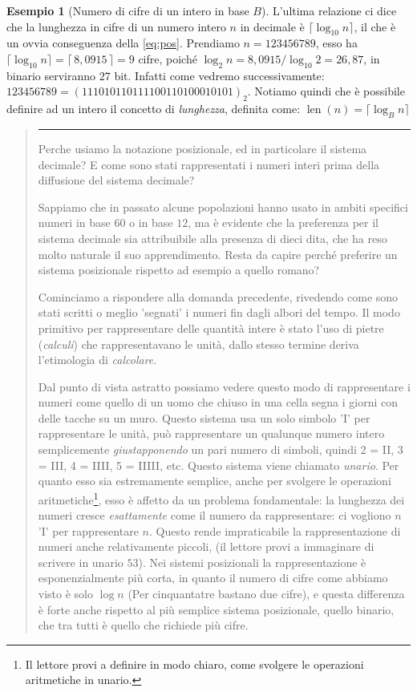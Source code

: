 \documentclass[a4paper]{book}
\theoremstyle{definition}
\newtheorem{ex}{Esempio}
\newcommand{\nota}[1]{\marginpar[{\raggedleft\small\sffamily #1\\}]{%
 								 {\raggedright\small\sffamily #1\\}}}
\begin{document}
\begin{ex}[Numero di cifre di un intero in base $B$] 
L'ultima relazione ci dice che la lunghezza in cifre di un numero intero $n$ in
decimale è $\lceil\log_{10} n \rceil$, il che è un ovvia conseguenza della
\eqref{eq:pos}. Prendiamo $n = 123456789$, esso ha $\lceil \log_{10} n \rceil =
\lceil\, 8,0915 \,\rceil = 9$ cifre, poiché $\log_2{n} = 8,0915 / \log_{10}{2}
= 26,87$, in binario serviranno $27$ bit. Infatti come vedremo successivamente:
$123456789 = (111010110111100110100010101)_2$. Notiamo quindi che è possibile definire ad un intero il concetto di \emph{lunghezza}, definita come:
$\operatorname{len}(n) = \lceil \log_B n \rceil$
\end{ex}

\begin{quote}
{\hfill \rule{0.9\textwidth}{0.5pt} \hfill}
\small

Perche usiamo la notazione posizionale, ed in particolare il sistema decimale?
E come sono stati rappresentati i numeri interi prima della diffusione del
sistema decimale?

Sappiamo che in passato alcune popolazioni hanno usato in ambiti specifici
numeri in base $60$ o in base $12$, ma è evidente che la preferenza per il
sistema decimale sia attribuibile alla presenza di dieci dita, che ha reso
molto naturale il suo apprendimento. Resta da capire perché preferire un
sistema posizionale rispetto ad esempio a quello romano?

Cominciamo a rispondere alla domanda precedente, rivedendo come sono stati
scritti o meglio 'segnati' i numeri fin dagli albori del tempo. Il modo
primitivo per rappresentare delle quantità intere è stato l'uso di pietre
(\emph{calculi}) che rappresentavano le unità, dallo stesso termine deriva
l'etimologia di \emph{calcolare}.

Dal punto di vista astratto possiamo vedere questo modo di rappresentare i
numeri come quello di un uomo che chiuso in una cella segna i giorni con delle
tacche su un muro. Questo sistema usa un solo simbolo '\textsc{I}' per
rappresentare le unità, può rappresentare un qualunque numero intero
semplicemente \emph{giustapponendo} un pari numero di simboli, quindi 2 =
\textsc{II}, 3 = \textsc{III}, 4 = \textsc{IIII}, 5 = \textsc{IIIII}, etc.
Questo sistema viene chiamato \emph{unario}.\nota{Sistema Unario} Per quanto
esso sia estremamente semplice, anche per svolgere le operazioni
aritmetiche\footnote{Il lettore provi a definire in modo chiaro, come svolgere
le operazioni aritmetiche in unario.}, esso è affetto da un problema
fondamentale: la lunghezza dei numeri cresce \emph{esattamente} come il numero
da rappresentare: ci vogliono $n$ 'I' per rappresentare $n$. Questo rende
impraticabile la rappresentazione di numeri anche relativamente piccoli, (il
lettore provi a immaginare di scrivere in unario $53$). Nei sistemi posizionali
la rappresentazione è esponenzialmente più corta, in quanto il numero di cifre
come abbiamo visto è solo $\log n$ (Per cinquantatre bastano due cifre), e
questa differenza è forte anche rispetto al più semplice sistema posizionale,
quello binario, che tra tutti è quello che richiede più cifre.


\end{quote}
\end{document}
